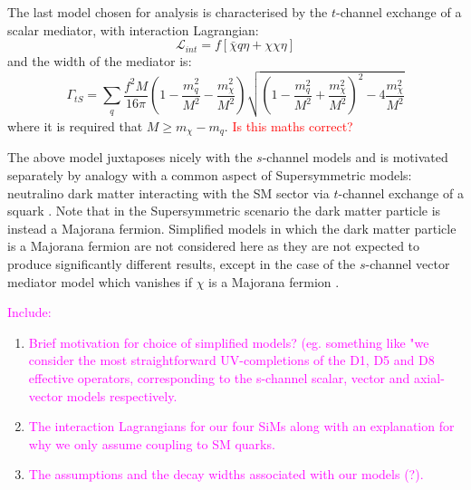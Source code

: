 \begin{flushleft}
\hspace{1cm}The last model chosen for analysis is characterised by the $t$-channel exchange of a scalar mediator, with interaction Lagrangian:
\begin{equation}
\label{L_int_tS}
\mathcal{L}_{int} = f \left[\bar{\chi}q\eta + \chi\chi\eta\right]
\end{equation}
and the width of the mediator is: 
\begin{equation}
\label{gamma_tS}
\Gamma_{tS} = \sum_{\substack{q}} \frac{f^{2}M}{16\pi}\left(1 - \frac{m_{q}^{2}}{M^{2}} - \frac{m_{\chi}^{2}}{M^{2}}\right)\sqrt{\left(1 - \frac{m_{q}^{2}}{M^{2}} + \frac{m_{\chi}^{2}}{M^{2}}\right)^{2} - 4\frac{m_{\chi}^{2}}{M^{2}}}
\end{equation}
where it is required that $M \geq m_{\chi} - m_{q}$. \textcolor{red}{Is this maths correct?}

The above model juxtaposes nicely with the $s$-channel models and is motivated separately by analogy with a common aspect of Supersymmetric models: neutralino dark matter interacting with the SM sector via $t$-channel exchange of a squark \cite{SUSYDM}. Note that in the Supersymmetric scenario the dark matter particle is instead a Majorana fermion. Simplified models in which the dark matter particle is a Majorana fermion are not considered here as they are not expected to produce significantly different results, except in the case of the $s$-channel vector mediator model which vanishes if $\chi$ is a Majorana fermion \cite{METSig}.
\bigskip

\textcolor{magenta}{Include:}
\begin{enumerate}
\item \textcolor{magenta}{Brief motivation for choice of simplified models? (eg. something like "we consider the most straightforward UV-completions of the D1, D5 and D8 effective operators, corresponding to the s-channel scalar, vector and axial-vector models respectively.}
\item \textcolor{magenta}{The interaction Lagrangians for our four SiMs along with an explanation for why we only assume coupling to SM quarks.}
\item \textcolor{magenta}{The assumptions and the decay widths associated with our models (?).}
\end{enumerate}
\end{flushleft}


